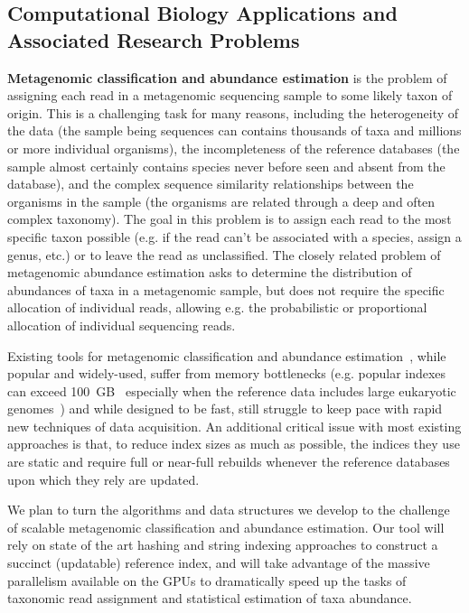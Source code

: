 \subsection{Computational Biology Applications and Associated Research Problems}
\label{subsec:target-applications}

\textbf{Metagenomic classification and abundance estimation} is the problem of assigning each read in a metagenomic sequencing sample to some likely taxon of origin.  This is a challenging task for many reasons, including the heterogeneity of the data (the sample being sequences can contains thousands of taxa and millions or more individual organisms), the incompleteness of the reference databases (the sample almost certainly contains species never before seen and absent from the database), and the complex sequence similarity relationships between the organisms in the sample (the organisms are related through a deep and often complex taxonomy).  The goal in this problem is to assign each read to the most specific taxon possible (e.g. if the read can't be associated with a species, assign a genus, etc.) or to leave the read as unclassified. The closely related problem of metagenomic abundance estimation asks to determine the distribution of abundances of taxa in a metagenomic sample, but does not require the specific allocation of individual reads, allowing e.g. the probabilistic or proportional allocation of individual sequencing reads.

Existing tools for metagenomic classification and abundance estimation~\cite{ames2013scalable, kim2016centrifuge, menzel2016fast, wood2014kraken, wood2019improved, dilthey2019strain,liu2018novel}, while popular and widely-used, suffer from memory bottlenecks (e.g. popular indexes can exceed 100~GB~\cite{simon2019benchmarking} especially when the reference data includes large eukaryotic genomes~\cite{meiser2017sequencing, knutson2017porcine}) and while designed to be fast, still struggle to keep pace with rapid new techniques of data acquisition.  An additional critical issue with most existing approaches is that, to reduce index sizes as much as possible, the indices they use are static and require full or near-full rebuilds whenever the reference databases upon which they rely are updated.

We plan to turn the algorithms and data structures we develop to the challenge of scalable metagenomic classification and abundance estimation. Our tool will rely on state of the art hashing and string indexing approaches to construct a succinct (updatable) reference index, and will take advantage of the massive parallelism available on the GPUs to dramatically speed up the tasks of taxonomic read assignment and statistical estimation of taxa abundance.

